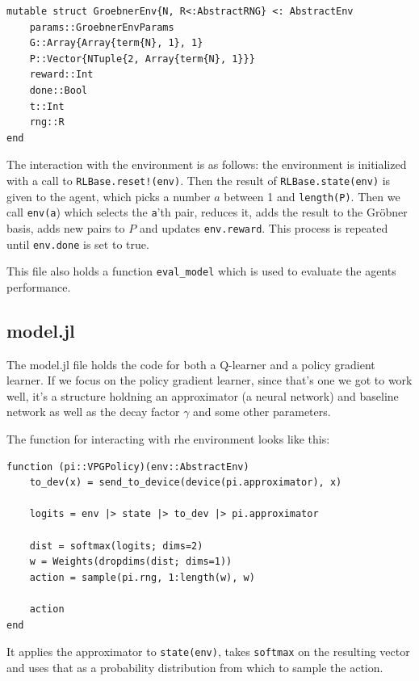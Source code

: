 \documentclass{article}
\theoremstyle{changedot}
\theoremstyle{changedotbreak}
\theoremstyle{nonumberplain}
\begin{document}
\begin{verbatim}
mutable struct GroebnerEnv{N, R<:AbstractRNG} <: AbstractEnv
    params::GroebnerEnvParams
    G::Array{Array{term{N}, 1}, 1}
    P::Vector{NTuple{2, Array{term{N}, 1}}}
    reward::Int
    done::Bool
    t::Int
    rng::R
end
\end{verbatim}

The interaction with the environment is as follows: the environment is initialized with a call to \texttt{RLBase.reset!(env)}. Then the result of \texttt{RLBase.state(env)} is given to the agent, which picks a number $a$ between 1 and \texttt{length(P)}. Then we call \texttt{env(a}) which selects the \texttt{a}'th pair, reduces it, adds the result to the Gröbner basis, adds new pairs to $P$ and updates \texttt{env.reward}. This process is repeated until \texttt{env.done} is set to true.

This file also holds a function \texttt{eval_model} which is used to evaluate the agents performance.

\subsection{model.jl}
The model.jl file holds the code for both a Q-learner and a policy gradient learner. If we focus on the policy gradient learner, since that's one we got to work well, it's a structure holdning an approximator (a neural network) and baseline network as well as the decay factor $\gamma$ and some other parameters.

The function for interacting with rhe environment looks like this:

\begin{verbatim}
function (pi::VPGPolicy)(env::AbstractEnv)
    to_dev(x) = send_to_device(device(pi.approximator), x)

    logits = env |> state |> to_dev |> pi.approximator

    dist = softmax(logits; dims=2)
    w = Weights(dropdims(dist; dims=1))
    action = sample(pi.rng, 1:length(w), w)

    action
end
\end{verbatim}

It applies the approximator to \texttt{state(env)}, takes \texttt{softmax} on the resulting vector and uses that as a probability distribution from which to sample the action.
\end{document}

